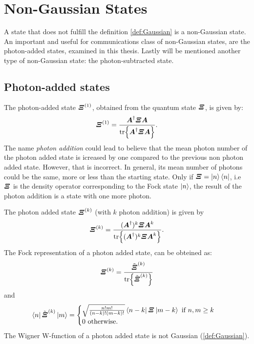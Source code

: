 \section{Non-Gaussian States} 
    A state that does not fulfill the definition \ref{def:Gaussian} is a non-Gaussian state.
    An important and useful for communications class of non-Gaussian states, are the photon-added 
    states, examined in this thesis. Lastly will be mentioned another type of non-Gaussian
    state: the photon-subtracted state.
    
    \subsection{Photon-added states}
        \label{PAS}
        The photon-added state $\bm{\relax{\varXi}}^{(1)}$, obtained from the quantum state $\bm{\relax{\varXi}}$,
        is given by:
        \begin{equation}
            \bm{\relax{\varXi}}^{(1)}=\frac{\bm{\relax{A}}^\dagger\bm{\relax{\varXi}}\bm{\relax{A}}}
            {\tr{\bm{\relax{A}}^\dagger\bm{\relax{\varXi}}\bm{\relax{A}}}}.
            \label{eq:photonAddedState}
        \end{equation}
        The name \emph{photon addition} could lead to believe that the mean photon number of the 
        photon added state is icreased by one compared to the previous non photon added state.
        However, that is incorrect.
        In general, its mean number of photons could be the same, more or less than the starting state.
        Only if $\bm{\relax{\varXi}}=\ket{n}\bra{n}$, i.e $\bm{\relax{\varXi}}$ is the density operator corresponding to
        the Fock state $\ket{n}$, the result of the photon addition is a state with one more photon.

        The photon added state $\bm{\relax{\varXi}}^{(k)}$ (with $k$ photon addition) is given by
        \begin{equation}
            \bm{\relax{\varXi}}^{(k)}=\frac{(\bm{\relax{A}}^\dagger)^k\bm{\relax{\varXi}}\bm{\relax{A}}^k}
            {\tr{(\bm{\relax{A}}^\dagger)^k\bm{\relax{\varXi}}\bm{\relax{A}}^k}}.
            \label{eq:PAS_k}
        \end{equation}
        The Fock representation of a photon added state, can be obteined as:
        \begin{equation}
            \bm{\relax{\varXi}}^{(k)}=\frac{\tilde{\bm{\relax{\varXi}}}^{(k)}}{\tr{\tilde{\bm{\relax{\varXi}}}^{(k)}}}
            \label{eq:FR_photonAdded}
        \end{equation}
        and
        \begin{equation*}
            \bra{n}\tilde{\Operator{\varXi}}^{(k)}\ket{m}=
            \begin{cases}
                \sqrt{\frac{n!m!}{(n-k)!(m-k)!}}\bra*{n-k}\Operator{\varXi}\ket*{m-k}\mbox{\ if\ }n,m \geq k\\
                0\mbox{\ otherwise}.
            \end{cases}
        \end{equation*}
        The Wigner W-function of a photon added state is not Gaussian (\ref{def:Gaussian}).

